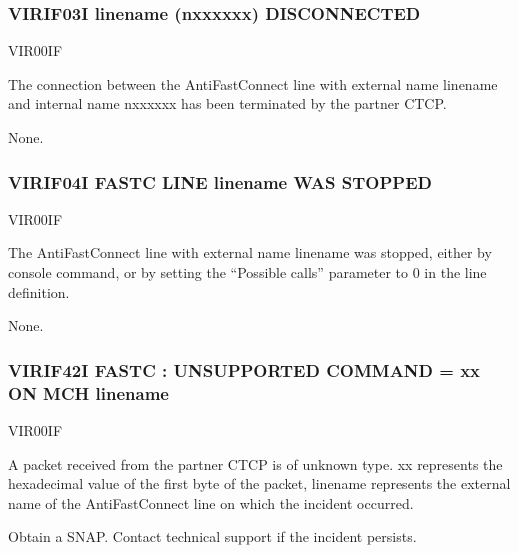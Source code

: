 \documentclass[letterpaper,10pt,english]{sphinxmanual}
\begin{document}
\subsubsection{VIRIF03I linename (n\sphinxhyphen{}xxxxxx) DISCONNECTED}
\label{\detokenize{messages:virif03i-linename-n-xxxxxx-disconnected}}\begin{description}
\sphinxAtStartPar
VIR00IF

\sphinxAtStartPar
The connection between the AntiFastConnect line with external name linename and internal name n\sphinxhyphen{}xxxxxx has been terminated by the partner CTCP.

\sphinxAtStartPar
None.

\end{description}


\subsubsection{VIRIF04I FASTC LINE linename WAS STOPPED}
\label{\detokenize{messages:virif04i-fastc-line-linename-was-stopped}}\begin{description}
\sphinxAtStartPar
VIR00IF

\sphinxAtStartPar
The AntiFastConnect line with external name linename was stopped, either by console command, or by setting the “Possible calls” parameter to 0 in the line definition.

\sphinxAtStartPar
None.

\end{description}


\subsubsection{VIRIF42I FASTC : UNSUPPORTED COMMAND = xx ON MCH linename}
\label{\detokenize{messages:virif42i-fastc-unsupported-command-xx-on-mch-linename}}\begin{description}
\sphinxAtStartPar
VIR00IF

\sphinxAtStartPar
A packet received from the partner CTCP is of unknown type. xx represents the hexadecimal value of the first byte of the packet, linename represents the external name of the AntiFastConnect line on which the incident occurred.

\sphinxAtStartPar
Obtain a SNAP. Contact technical support if the incident persists.

\end{description}
\end{document}
